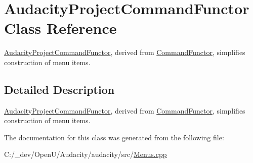 \hypertarget{class_audacity_project_command_functor}{}\section{Audacity\+Project\+Command\+Functor Class Reference}
\label{class_audacity_project_command_functor}


\hyperlink{class_audacity_project_command_functor}{Audacity\+Project\+Command\+Functor}, derived from \hyperlink{class_command_functor}{Command\+Functor}, simplifies construction of menu items.  




\subsection{Detailed Description}
\hyperlink{class_audacity_project_command_functor}{Audacity\+Project\+Command\+Functor}, derived from \hyperlink{class_command_functor}{Command\+Functor}, simplifies construction of menu items. 

The documentation for this class was generated from the following file\+:\begin{DoxyCompactItemize}
\item 
C\+:/\+\_\+dev/\+Open\+U/\+Audacity/audacity/src/\hyperlink{_menus_8cpp}{Menus.\+cpp}\end{DoxyCompactItemize}
